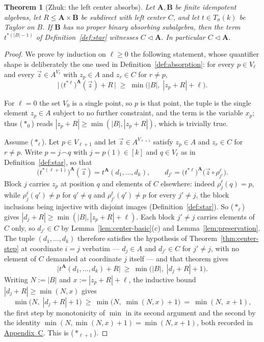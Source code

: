 \documentclass[11pt]{article}
\theoremstyle{mainplain}
\newtheorem{theorem}{Theorem}[section]
\theoremstyle{mainroman}
\theoremstyle{definition}
\numberwithin{equation}{section}
\newcommand{\bA}{\mathbf A}
\newcommand{\bB}{\mathbf B}
\newcommand{\ab}{\lhd}
\newcommand{\Tm}{T_\sigma}
\begin{document}
\begin{theorem}[Zhuk: the left center absorbs]\label{thm:center-absorbs}
Let $\bA,\bB$ be finite idempotent algebras, let $R\le\bA\times\bB$ be
subdirect with left center $C$, and let $t\in\Tm(k)$ be Taylor on $B$. If
$\bB$ has no proper binary absorbing subalgebra, then the term
$t^{*(|B|-1)}$ of Definition~\ref{def:star} witnesses $C\ab\bA$. In particular
$C\ab\bA$.
\end{theorem}
\begin{proof}
We prove by induction on $\ell\ge0$ the following statement, whose quantifier
shape is deliberately the one used in Definition~\ref{def:absorption}: for
every $p\in V_{\ell}$ and every $\vec z\in A^{V_{\ell}}$ with $z_p\in A$ and
$z_r\in C$ for $r\ne p$,
\[
 \bigl|\,\bigl(t^{*\ell}\bigr)^{\bA}(\vec z)+R\,\bigr|
 \;\ge\;\min\bigl(|B|,\;|z_p+R|+\ell\bigr).
 \tag{$\ast_\ell$}
\]

For $\ell=0$ the set $V_0$ is a single point, so $p$ is that point, the tuple is
the single element $z_p\in A$ subject to no further constraint, and the term is
the variable $x_p$; thus ($\ast_0$) reads $|z_p+R|\ge\min(|B|,|z_p+R|)$, which
is trivially true.

Assume ($\ast_\ell$). Let $p\in V_{\ell+1}$ and let $\vec z\in A^{V_{\ell+1}}$
satisfy $z_p\in A$ and $z_r\in C$ for $r\ne p$. Write $p=j\frown q$ with
$j=p(1)\in[k]$ and $q\in V_{\ell}$ as in Definition~\ref{def:star}, so that
\[
 \bigl(t^{*(\ell+1)}\bigr)^{\bA}(\vec z)
 = t^{\bA}(d_1,\dots,d_k),\qquad
 d_{j'}=\bigl(t^{*\ell}\bigr)^{\bA}\bigl(\vec z\circ\rho^{\ell}_{j'}\bigr).
\]
Block $j$ carries $z_p$ at position $q$ and elements of $C$ elsewhere: indeed
$\rho^{\ell}_j(q)=p$, while $\rho^{\ell}_{j}(q')\ne p$ for $q'\ne q$ and
$\rho^{\ell}_{j'}(q')\ne p$ for every $j'\ne j$, the block inclusions being
injective with disjoint images (Definition~\ref{def:star}). So
($\ast_\ell$) gives $|d_j+R|\ge\min(|B|,|z_p+R|+\ell)$. Each block $j'\ne j$
carries elements of $C$ only, so $d_{j'}\in C$ by
Lemma~\ref{lem:center-basic}(c) and Lemma~\ref{lem:preservation}. The tuple
$(d_1,\dots,d_k)$ therefore satisfies the hypothesis of
Theorem~\ref{thm:center-step} at coordinate $i=j$ verbatim --- $d_j\in A$ and
$d_{j'}\in C$ for $j'\ne j$, with no element of $C$ demanded at coordinate $j$
itself --- and that theorem gives
\[
 \bigl|t^{\bA}(d_1,\dots,d_k)+R\bigr|\ \ge\ \min\bigl(|B|,\;|d_j+R|+1\bigr).
\]
Writing $N:=|B|$ and $x:=|z_p+R|+\ell$, the inductive bound $|d_j+R|\ge\min(N,x)$
gives
\[
 \min\bigl(N,\;|d_j+R|+1\bigr)\ \ge\ \min\bigl(N,\;\min(N,x)+1\bigr)
 \ =\ \min(N,\;x+1),
\]
the first step by monotonicity of $\min$ in its second argument and the second
by the identity $\min(N,\min(N,x)+1)=\min(N,x+1)$, both recorded in
\hyperref[app:background]{Appendix~C}. This is ($\ast_{\ell+1}$).


\end{proof}
\end{document}
